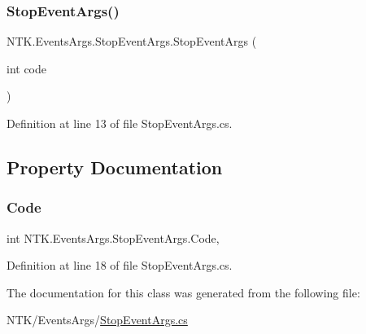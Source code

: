 \subsubsection{\texorpdfstring{StopEventArgs()}{StopEventArgs()}}
{\footnotesize\ttfamily N\+T\+K.\+Events\+Args.\+Stop\+Event\+Args.\+Stop\+Event\+Args (\begin{DoxyParamCaption}\item[{int}]{code }\end{DoxyParamCaption})}



Definition at line 13 of file Stop\+Event\+Args.\+cs.



\subsection{Property Documentation}
\mbox{\label{class_n_t_k_1_1_events_args_1_1_stop_event_args_ab4a83a76d50f8049d7df310c1f1aa67a}} 
\subsubsection{\texorpdfstring{Code}{Code}}
{\footnotesize\ttfamily int N\+T\+K.\+Events\+Args.\+Stop\+Event\+Args.\+Code\hspace{0.3cm}{\ttfamily [get]}, {\ttfamily [set]}}



Definition at line 18 of file Stop\+Event\+Args.\+cs.



The documentation for this class was generated from the following file\+:\begin{DoxyCompactItemize}
\item 
N\+T\+K/\+Events\+Args/\mbox{\hyperlink{_stop_event_args_8cs}{Stop\+Event\+Args.\+cs}}\end{DoxyCompactItemize}
